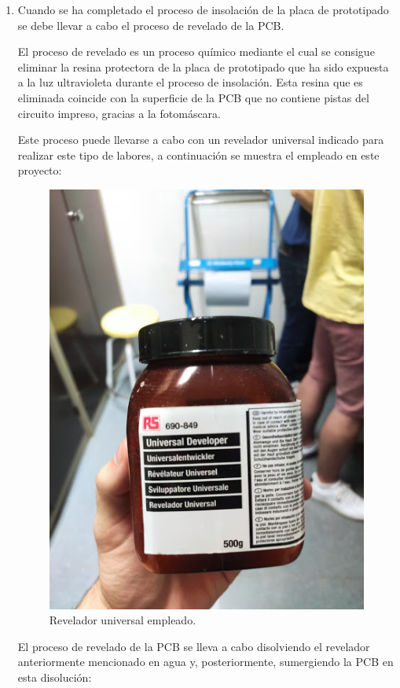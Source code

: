 \begin{enumerate}
    \item Cuando se ha completado el proceso de insolación de la placa de prototipado se debe llevar a cabo el proceso de revelado de la \ac{PCB}.
    
    El proceso de revelado es un proceso químico mediante el cual se consigue eliminar la resina protectora de la placa de prototipado que ha sido expuesta a la luz ultravioleta durante el proceso de insolación. Esta resina que es eliminada coincide con la superficie de la \ac{PCB} que no contiene pistas del circuito impreso, gracias a la fotomáscara.
    
    Este proceso puede llevarse a cabo con un revelador universal indicado para realizar este tipo de labores, a continuación se muestra el empleado en este proyecto:
    
    \begin{figure}[H]
    \centering 
    \includegraphics[width=0.6\linewidth]{pictures/Revelador.jpg}
    \caption{Revelador universal empleado.}
    \end{figure}
    
    El proceso de revelado de la \ac{PCB} se lleva a cabo disolviendo el revelador anteriormente mencionado en agua y, posteriormente, sumergiendo la \ac{PCB} en esta disolución:
    

\end{enumerate}
